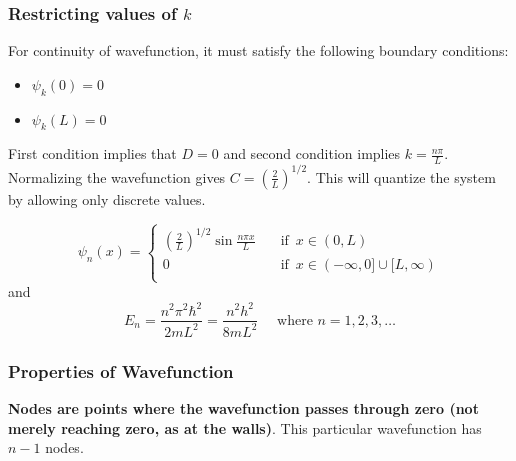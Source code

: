 \documentclass[11pt]{article}
\theoremstyle{definition}
\begin{document}
\subsubsection{Restricting values of $k$}

For continuity of wavefunction, it must satisfy the following boundary conditions:
\begin{itemize}
    \item $\psi_k (0) = 0$
    \item $\psi_k (L) = 0$
\end{itemize}

First condition implies that $D=0$ and second condition implies $k = \frac{n\pi}{L}$. Normalizing the wavefunction gives $C = \left(\frac{2}{L}\right)^{1/2}$. This will quantize the system by allowing only discrete values.
\begin{shaded}
\begin{equation*}
\psi_n(x) =\begin{cases}
          \left(\frac{2}{L}\right)^{1/2}\sin{\frac{n\pi x}{L}} \quad &\text{if } \, x \in (0,L) \\
          0 \quad &\text{if } \, x \in (-\infty,0] \cup [L, \infty) \\
     \end{cases}
\end{equation*}
and 
\begin{equation*}
    E_n = \frac{n^2 \pi^2 \hbar^2}{2mL^2} = \frac{n^2 h^2}{8mL^2} \quad  \text{ where }n=1,2,3,\dots
\end{equation*}
\end{shaded}
\subsubsection{Properties of Wavefunction}
\textbf{Nodes are points where the wavefunction passes through zero (not merely reaching zero, as at the walls)}. This particular wavefunction has $n-1$ nodes.

\end{document}
